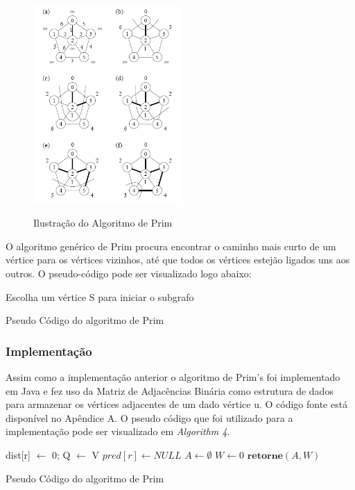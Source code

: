 \documentclass[a4paper,12pt]{article}
\begin{document}
\begin{figure}[h!]
	\caption{Ilustração do Algoritmo de Prim}
	\centering
	\includegraphics[width=0.5\textwidth]{prim}
	\label{fig:prim_fig}
\end{figure}

O algoritmo genérico de Prim procura encontrar o caminho mais curto de um vértice para os vértices vizinhos, até que todos os vértices estejão ligados uns aos outros. O pseudo-código pode ser visualizado logo abaixo:

\begin{algorithm}[H]
\SetAlgoLined
{}
Escolha um vértice S para iniciar o subgrafo\;
\caption{Pseudo Código do algoritmo de Prim}
\end{algorithm}

\subsubsection{Implementação}
Assim como a implementação anterior o algoritmo de Prim's foi implementado em Java e fez uso da Matriz de Adjacências Binária como estrutura de dados para armazenar os vértices adjacentes de um dado vértice u.  O código fonte está disponível no Apêndice A. O pseudo código que foi utilizado para a implementação pode ser visualizado em \emph{Algorithm 4}.

\begin{algorithm}[H]
\LinesNumbered
\SetAlgoLined
{}
dist[r] $\gets$ 0;
Q $\gets$ V\;
$ pred[r] \gets NULL$\;
$ A \gets \emptyset$\;
$ W \gets 0$\;
$\textbf{retorne} (A, W)$\;
\caption{Pseudo Código do algoritmo de Prim}
\end{algorithm}
\end{document}
